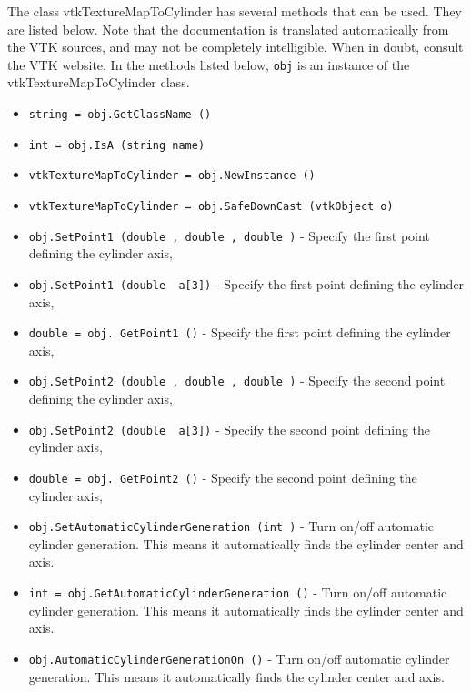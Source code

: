 The class vtkTextureMapToCylinder has several methods that can be used.
  They are listed below.
Note that the documentation is translated automatically from the VTK sources,
and may not be completely intelligible.  When in doubt, consult the VTK website.
In the methods listed below, \verb|obj| is an instance of the vtkTextureMapToCylinder class.
\begin{itemize}
\item  \verb|string = obj.GetClassName ()|

\item  \verb|int = obj.IsA (string name)|

\item  \verb|vtkTextureMapToCylinder = obj.NewInstance ()|

\item  \verb|vtkTextureMapToCylinder = obj.SafeDownCast (vtkObject o)|

\item  \verb|obj.SetPoint1 (double , double , double )| -  Specify the first point defining the cylinder axis,

\item  \verb|obj.SetPoint1 (double  a[3])| -  Specify the first point defining the cylinder axis,

\item  \verb|double = obj. GetPoint1 ()| -  Specify the first point defining the cylinder axis,

\item  \verb|obj.SetPoint2 (double , double , double )| -  Specify the second point defining the cylinder axis,

\item  \verb|obj.SetPoint2 (double  a[3])| -  Specify the second point defining the cylinder axis,

\item  \verb|double = obj. GetPoint2 ()| -  Specify the second point defining the cylinder axis,

\item  \verb|obj.SetAutomaticCylinderGeneration (int )| -  Turn on/off automatic cylinder generation. This means it automatically
 finds the cylinder center and axis.

\item  \verb|int = obj.GetAutomaticCylinderGeneration ()| -  Turn on/off automatic cylinder generation. This means it automatically
 finds the cylinder center and axis.

\item  \verb|obj.AutomaticCylinderGenerationOn ()| -  Turn on/off automatic cylinder generation. This means it automatically
 finds the cylinder center and axis.


\end{itemize}
